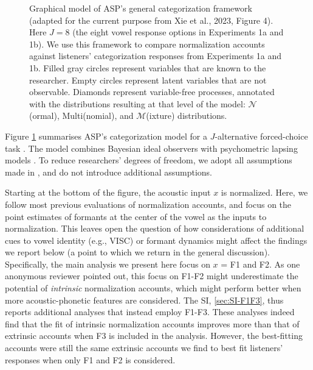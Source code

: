 \documentclass[preprint]{JASA}
\begin{document}
\begin{figure}[!ht]
\begin{center}
\caption{Graphical model of ASP's general categorization framework (adapted for the current purpose from Xie et al., 2023, Figure 4). Here $J=8$ (the eight vowel response options in Experiments 1a and 1b). We use this framework to compare normalization accounts against listeners' categorization responses from Experiments 1a and 1b. Filled gray circles represent variables that are known to the researcher. Empty circles represent latent variables that are not observable. Diamonds represent variable-free processes, annotated with the distributions resulting at that level of the model: $\mathcal{N}$(ormal), Multi(nomial), and $\mathcal{M}$(ixture) distributions.} \label{fig:model-perceptual-decision-making}
\end{center}
\end{figure}

Figure \ref{fig:model-perceptual-decision-making} summarises ASP's categorization model for a \(J\)-alternative forced-choice task \citep[for an in-depth description, we refer to][]{xie2023}. The model combines Bayesian ideal observers \citetext{\citealp[as used in e.g.,][]{clayards2008}; \citealp{feldman2009}; \citealp{norris-mcqueen2008}; \citealp{xie2021}; \citealp[for a closely related approach, see also][]{nearey-hogan1986}} with psychometric lapsing models \citep{wichmann-hill2001}. To reduce researchers' degrees of freedom, we adopt all assumptions made in \citet{xie2023}, and do not introduce additional assumptions.

Starting at the bottom of the figure, the acoustic input \(x\) is normalized. Here, we follow most previous evaluations of normalization accounts, and focus on the point estimates of formants at the center of the vowel as the inputs to normalization. This leaves open the question of how considerations of additional cues to vowel identity (e.g., VISC) or formant dynamics might affect the findings we report below (a point to which we return in the general discussion). Specifically, the main analysis we present here focus on \(x\) = F1 and F2. As one anonymous reviewer pointed out, this focus on F1-F2 might underestimate the potential of \emph{intrinsic} normalization accounts, which might perform better when more acoustic-phonetic features are considered. The SI, \ref{sec:SI-F1F3}, thus reports additional analyses that instead employ F1-F3. These analyses indeed find that the fit of intrinsic normalization accounts improves more than that of extrinsic accounts when F3 is included in the analysis. However, the best-fitting accounts were still the same extrinsic accounts we find to best fit listeners' responses when only F1 and F2 is considered.
\end{document}
